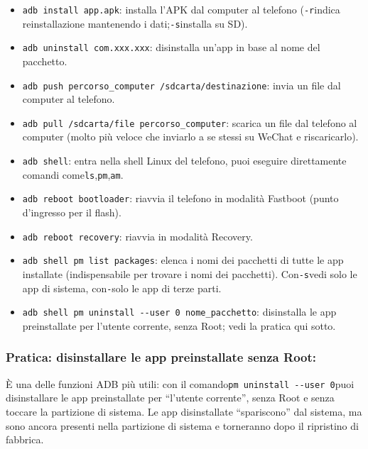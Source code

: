 \begin{itemize}
  \item \texttt{adb install app.\allowbreak apk}: installa l'APK dal computer al telefono (\texttt{-\allowbreak r}indica reinstallazione mantenendo i dati;\texttt{-\allowbreak s}installa su SD).
  \item \texttt{adb uninstall com.\allowbreak xxx.\allowbreak xxx}: disinstalla un'app in base al nome del pacchetto.
  \item \texttt{adb push percorso\_computer /\allowbreak sdcarta/\allowbreak destinazione}: invia un file dal computer al telefono.
  \item \texttt{adb pull /\allowbreak sdcarta/\allowbreak file percorso\_computer}: scarica un file dal telefono al computer (molto più veloce che inviarlo a se stessi su WeChat e riscaricarlo).
  \item \texttt{adb shell}: entra nella shell Linux del telefono, puoi eseguire direttamente comandi come\texttt{ls},\texttt{pm},\texttt{am}.
  \item \texttt{adb reboot bootloader}: riavvia il telefono in modalità Fastboot (punto d'ingresso per il flash).
  \item \texttt{adb reboot recovery}: riavvia in modalità Recovery.
  \item \texttt{adb shell pm list packages}: elenca i nomi dei pacchetti di tutte le app installate (indispensabile per trovare i nomi dei pacchetti). Con\texttt{-\allowbreak s}vedi solo le app di sistema, con\texttt{-}solo le app di terze parti.
  \item \texttt{adb shell pm uninstall -\allowbreak -\allowbreak user 0 nome\_pacchetto}: disinstalla le app preinstallate per l'utente corrente, senza Root; vedi la pratica qui sotto.
\end{itemize}

\subsubsection*{Pratica: disinstallare le app preinstallate senza Root:}

È una delle funzioni ADB più utili: con il comando\texttt{pm uninstall -\allowbreak -\allowbreak user 0}puoi disinstallare le app preinstallate per “l'utente corrente”, senza Root e senza toccare la partizione di sistema. Le app disinstallate “spariscono” dal sistema, ma sono ancora presenti nella partizione di sistema e torneranno dopo il ripristino di fabbrica.

